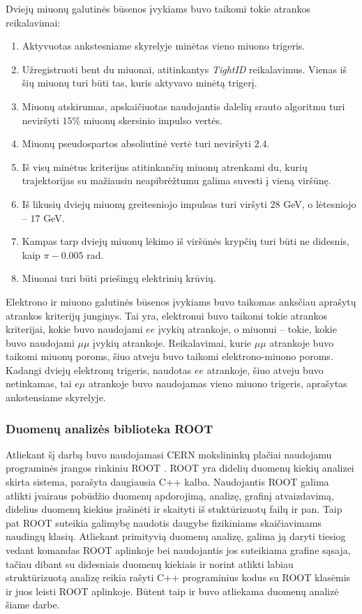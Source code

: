 \documentclass[a4paper, 12pt]{article}
\newcommand{\emu}{e\mu}
\newcommand{\mumu}{\mu\mu}
\begin{document}
Dviejų miuonų galutinės būsenos įvykiams buvo taikomi tokie atrankos reikalavimai:
\begin{enumerate}
	\item Aktyvuotas ankstesniame skyrelyje minėtas vieno miuono trigeris.
	\item Užregistruoti bent du miuonai, atitinkantys \textit{TightID} reikalavimus. Vienas iš šių miuonų turi būti
	tas, kuris aktyvavo	minėtą trigerį.
	\item Miuonų atskirumas, apskaičiuotas naudojantis dalelių srauto algoritmu turi neviršyti $15\%$ miuonų skersinio
	impulso vertės.
	\item Miuonų pseudospartos absoliutinė vertė turi neviršyti $2.4$.
	\item Iš visų minėtus kriterijus atitinkančių miuonų atrenkami du, kurių trajektorijas su mažiausiu neapibrėžtumu
	galima suvesti į vieną viršūnę.
	\item Iš likusių dviejų miuonų greitesniojo impulsas turi viršyti $28$ GeV, o lėtesniojo -- $17$ GeV.
	\item Kampas tarp dviejų miuonų lėkimo iš viršūnės krypčių turi būti ne didesnis, kaip $\pi - 0.005$ rad.
	\item Miuonai turi būti priešingų elektrinių krūvių.
\end{enumerate}

Elektrono ir miuono galutinės būsenos įvykiams buvo taikomas anksčiau aprašytų atrankos kriterijų junginys.
Tai yra, elektronui buvo taikomi tokie atrankos kriterijai, kokie buvo naudojami $ee$ įvykių atrankoje, o miuonui --
tokie, kokie buvo naudojami $\mumu$ įvykių atrankoje. Reikalavimai, kurie $\mumu$ atrankoje buvo taikomi miuonų poroms,
šiuo atveju buvo taikomi elektrono-miuono poroms.
Kadangi dviejų elektronų trigeris, naudotas $ee$ atrankoje, šiuo atveju buvo netinkamas, tai $\emu$ atrankoje buvo naudojamas
vieno miuono trigeris, aprašytas ankstensiame skyrelyje.

\subsubsection{Duomenų analizės biblioteka ROOT}

Atliekant šį darbą buvo naudojamasi CERN mokslininkų plačiai naudojamu programinės įrangos rinkiniu ROOT \cite{ROOT}.
ROOT yra didelių duomenų kiekių analizei skirta sistema, parašyta daugiausia C++ kalba.
Naudojantis ROOT galima atlikti įvairaus pobūdžio duomenų apdorojimą, analizę, grafinį atvaizdavimą, didelius duomenų
kiekius įrašinėti ir skaityti iš stuktūrizuotų failų ir pan.
Taip pat ROOT suteikia galimybę naudotis daugybe fizikiniams skaičiavimams naudingų klasių.
Atliekant primityvią duomenų analizę, galima ją daryti tiesiog vedant komandas ROOT aplinkoje bei naudojantis jos
suteikiama grafine sąsaja, tačiau dibant su didesniais duomenų kiekiais ir norint atlikti labiau struktūrizuotą analizę
reikia rašyti C++ programinius kodus su ROOT klasėmis ir juos leisti ROOT aplinkoje.
Būtent taip ir buvo atliekama duomenų analizė šiame darbe.
\end{document}
